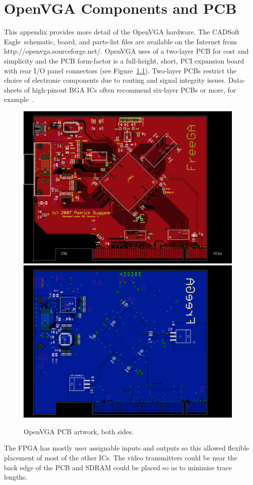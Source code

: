 \chapter{OpenVGA Components and PCB}
\label{HARDWARE}

This appendix provides more detail of the OpenVGA hardware. The CADSoft
Eagle\texttrademark~schematic, board, and parts-list files are available on the
Internet from http://openvga.sourceforge.net/. OpenVGA uses of a two-layer PCB
for cost and simplicity and the PCB form-factor is a full-height, short, PCI
expansion board with rear I/O panel connectors (see Figure~\ref{HARDWARE__PCB}).
Two-layer PCBs restrict the choice of electronic components due to routing and
signal integrity issues. Data-sheets of high-pinout BGA ICs often recommend
six-layer PCBs or more, for example~\cite{Xilinx_SP3_DS}.

\begin{figure}[h!]
\begin{center}
\includegraphics[width=0.49\linewidth]{images/freega3_pcb_art_top.png}
\includegraphics[width=0.49\linewidth]{images/freega3_pcb_art_bot.png}
\end{center}
\caption[OpenVGA PCB artwork, both sides]{OpenVGA PCB artwork, both sides.}
\label{HARDWARE__PCB}
\end{figure}


The FPGA has mostly user assignable inputs and outputs so this allowed flexible
placement of most of the other ICs. The video transmitters could be near the back
edge of the PCB and SDRAM could be placed so as to minimise trace lengths.

